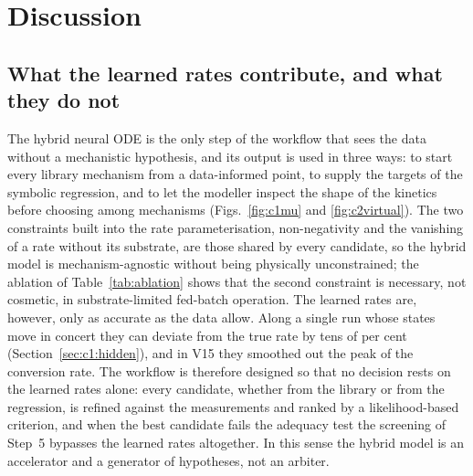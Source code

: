 \section{Discussion}\label{sec:discussion}

\subsection{What the learned rates contribute, and what they do not}
The hybrid neural ODE is the only step of the workflow that sees the data without a mechanistic hypothesis, and its output is used in three ways: to start every library mechanism from a data-informed point, to supply the targets of the symbolic regression, and to let the modeller inspect the shape of the kinetics before choosing among mechanisms (Figs.~\ref{fig:c1mu} and \ref{fig:c2virtual}). The two constraints built into the rate parameterisation, non-negativity and the vanishing of a rate without its substrate, are those shared by every candidate, so the hybrid model is mechanism-agnostic without being physically unconstrained; the ablation of Table~\ref{tab:ablation} shows that the second constraint is necessary, not cosmetic, in substrate-limited fed-batch operation. The learned rates are, however, only as accurate as the data allow. Along a single run whose states move in concert they can deviate from the true rate by tens of per cent (Section~\ref{sec:c1:hidden}), and in V15 they smoothed out the peak of the conversion rate. The workflow is therefore designed so that no decision rests on the learned rates alone: every candidate, whether from the library or from the regression, is refined against the measurements and ranked by a likelihood-based criterion, and when the best candidate fails the adequacy test the screening of Step~5 bypasses the learned rates altogether. In this sense the hybrid model is an accelerator and a generator of hypotheses, not an arbiter.

